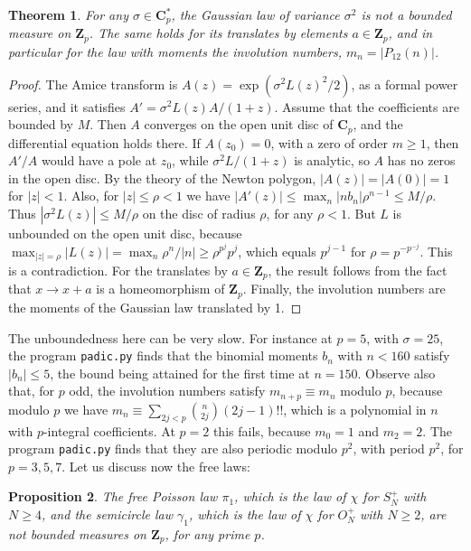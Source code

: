 \documentclass[11pt]{amsart}
\newtheorem{theorem}{Theorem}[section]
\newtheorem{proposition}[theorem]{Proposition}
\theoremstyle{definition}
\begin{document}
\begin{theorem}
\label{t74}
For any $\sigma\in\mathbf C_p^*$, the Gaussian law of variance $\sigma^2$ is not a bounded measure on $\mathbf Z_p$. The same holds for its translates by elements $a\in\mathbf Z_p$, and in particular for the law with moments the involution numbers, $m_n=|P_{12}(n)|$.
\end{theorem}

\begin{proof}
The Amice transform is $A(z)=\exp(\sigma^2L(z)^2/2)$, as a formal power series, and it satisfies $A'=\sigma^2L(z)A/(1+z)$. Assume that the coefficients are bounded by $M$. Then $A$ converges on the open unit disc of $\mathbf C_p$, and the differential equation holds there. If $A(z_0)=0$, with a zero of order $m\geq1$, then $A'/A$ would have a pole at $z_0$, while $\sigma^2L/(1+z)$ is analytic, so $A$ has no zeros in the open disc. By the theory of the Newton polygon, $|A(z)|=|A(0)|=1$ for $|z|<1$. Also, for $|z|\leq\rho<1$ we have $|A'(z)|\leq\max_n|nb_n|\rho^{n-1}\leq M/\rho$. Thus $|\sigma^2L(z)|\leq M/\rho$ on the disc of radius $\rho$, for any $\rho<1$. But $L$ is unbounded on the open unit disc, because $\max_{|z|=\rho}|L(z)|=\max_n\rho^n/|n|\geq\rho^{p^j}p^j$, which equals $p^{j-1}$ for $\rho=p^{-p^{-j}}$. This is a contradiction. For the translates by $a\in\mathbf Z_p$, the result follows from the fact that $x\to x+a$ is a homeomorphism of $\mathbf Z_p$. Finally, the involution numbers are the moments of the Gaussian law translated by 1.
\end{proof}

The unboundedness here can be very slow. For instance at $p=5$, with $\sigma=25$, the program {\tt padic.py} finds that the binomial moments $b_n$ with $n<160$ satisfy $|b_n|\leq5$, the bound being attained for the first time at $n=150$. Observe also that, for $p$ odd, the involution numbers satisfy $m_{n+p}\equiv m_n$ modulo $p$, because modulo $p$ we have $m_n\equiv\sum_{2j<p}\binom{n}{2j}(2j-1)!!$, which is a polynomial in $n$ with $p$-integral coefficients. At $p=2$ this fails, because $m_0=1$ and $m_2=2$. The program {\tt padic.py} finds that they are also periodic modulo $p^2$, with period $p^2$, for $p=3,5,7$. Let us discuss now the free laws:

\begin{proposition}
\label{p75}
The free Poisson law $\pi_1$, which is the law of $\chi$ for $S_N^+$ with $N\geq4$, and the semicircle law $\gamma_1$, which is the law of $\chi$ for $O_N^+$ with $N\geq2$, are not bounded measures on $\mathbf Z_p$, for any prime $p$.
\end{proposition}
\end{document}
